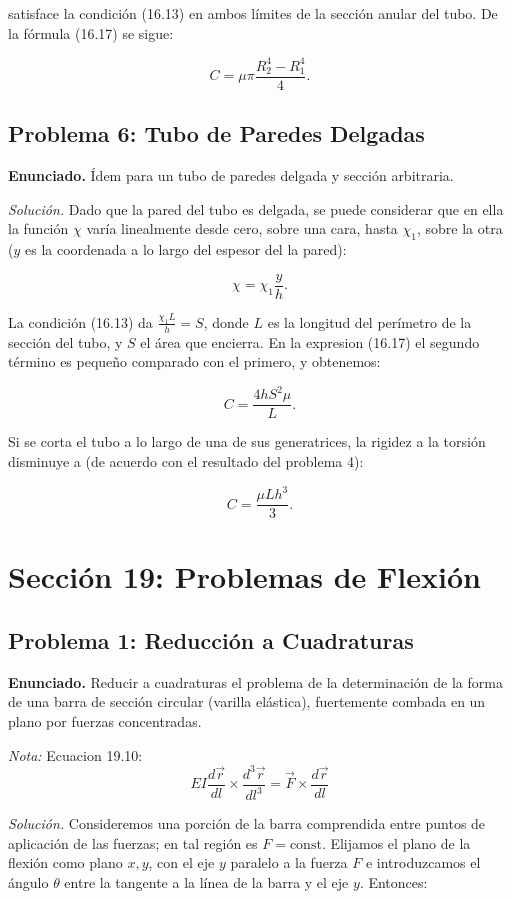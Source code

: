 \documentclass{article}
\begin{document}
satisface la condición (16.13) en ambos límites de la sección anular del tubo. De la fórmula (16.17) se sigue:

$$
C = \mu \pi \frac{R_2^4 - R_1^4}{4}.
$$

\subsection*{Problema 6: Tubo de Paredes Delgadas}
\textbf{Enunciado.} Ídem para un tubo de paredes delgada y sección arbitraria.

\textit{Solución.} Dado que la pared del tubo es delgada, se puede considerar que en ella la función $\chi$ varía linealmente desde cero, sobre una cara, hasta $\chi_1$, sobre la otra ($y$ es la coordenada a lo largo del espesor del la pared):

$$
\chi = \chi_1 \frac{y}{h}.
$$

La condición (16.13) da $\frac{\chi_1 L}{h} = S$, donde $L$ es la longitud del perímetro de la sección del tubo, y $S$ el área que encierra. En la expresion (16.17) el segundo término es pequeño comparado con el primero, y obtenemos:

$$
C = \frac{4hS^2 \mu}{L}.
$$

Si se corta el tubo a lo largo de una de sus generatrices, la rigidez a la torsión disminuye a (de acuerdo con el resultado del problema 4):

$$
C = \frac{\mu Lh^3}{3}.
$$

\section*{Sección 19: Problemas de Flexión}

\subsection*{Problema 1: Reducción a Cuadraturas}
\textbf{Enunciado.} Reducir a cuadraturas el problema de la determinación de la forma de una barra de sección circular (varilla elástica), fuertemente combada en un plano por fuerzas concentradas.

\textit{Nota:} Ecuacion 19.10: $$ EI\frac{d\vec{r}}{dl}\times \frac{d^{3}\vec{r}}{dl^{3}} = \vec{F}\times\frac{d\vec{r}}{dl}$$

\textit{Solución.} Consideremos una porción de la barra comprendida entre puntos de aplicación de las fuerzas; en tal región es $F = \text{const}$. Elijamos el plano de la flexión como plano $x, y$, con el eje $y$ paralelo a la fuerza $F$ e introduzcamos el ángulo $\theta$ entre la tangente a la línea de la barra y el eje $y$. Entonces:
\end{document}
